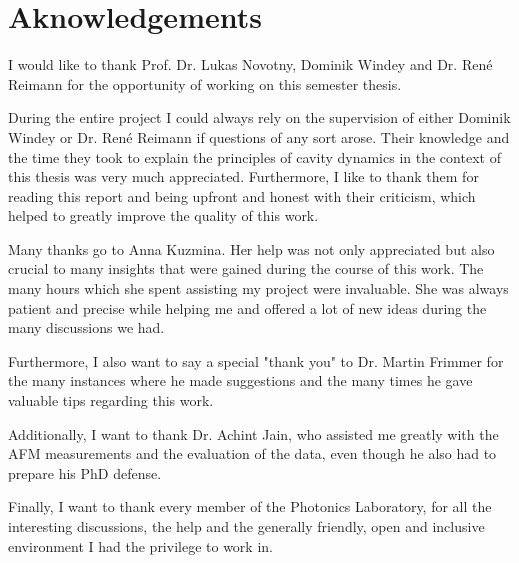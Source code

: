 \cleardoublepage
\thispagestyle{empty}
\section*{Aknowledgements}
I would like to thank Prof. Dr. Lukas Novotny, Dominik Windey and Dr. Ren\'{e} Reimann for the opportunity of working on this semester thesis.

During the entire project I could always rely on the supervision of either Dominik Windey or Dr. Ren\'{e} Reimann if questions of any sort arose. Their knowledge and the time they took to explain the principles of cavity dynamics in the context of this thesis was very much appreciated. Furthermore, I like to thank them for reading this report and being upfront and honest with their criticism, which helped to greatly improve the quality of this work.

Many thanks go to Anna Kuzmina. Her help was not only appreciated but also crucial to many insights that were gained during the course of this work. The many hours which she spent assisting my project were invaluable. She was always patient and precise while helping me and offered a lot of new ideas during the many discussions we had.

Furthermore, I also want to say a special "thank you" to Dr. Martin Frimmer for the many instances where he made suggestions and the many times he gave valuable tips regarding this work.

Additionally, I want to thank Dr. Achint Jain, who assisted me greatly with the AFM measurements and the evaluation of the data, even though he also had to prepare his PhD defense.

Finally, I want to thank every member of the Photonics Laboratory, for all the interesting discussions, the help and the generally friendly, open and inclusive environment I had the privilege to work in.